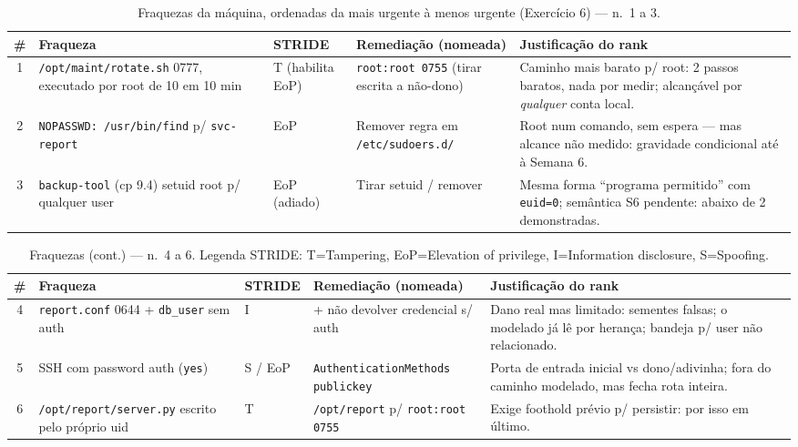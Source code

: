 \documentclass[a4paper,11pt]{article}
\newcommand{\cmd}[1]{\textcolor{sscnblue}{\texttt{#1}}}
\begin{document}
\begin{table}[H]
\centering
\caption{Fraquezas da m\'aquina, ordenadas da mais urgente \`a menos urgente (Exerc\'icio 6) --- n.\textordmasculine\ 1 a 3.}
\label{tab:prioridades}
\scriptsize
\setlength{\tabcolsep}{3pt}
\renewcommand{\arraystretch}{1.25}
\begin{tabularx}{\textwidth}{@{}c >{\raggedright\arraybackslash}p{3.2cm} >{\raggedright\arraybackslash}p{1.7cm} >{\raggedright\arraybackslash}p{3.1cm} >{\raggedright\arraybackslash}X@{}}
\toprule
\textbf{\#} & \textbf{Fraqueza} & \textbf{STRIDE} & \textbf{Remedia\c{c}\~ao (nomeada)} & \textbf{Justifica\c{c}\~ao do rank} \\
\midrule
\rowcolor{sscbg}
1 & \cmd{/opt/maint/rotate.sh} 0777, executado por root de 10 em 10 min & T (habilita EoP) & \cmd{root:root 0755} (tirar escrita a n\~ao-dono) & Caminho mais barato p/ root: 2 passos baratos, nada por medir; alcan\c{c}\'avel por \emph{qualquer} conta local. \\
2 & \cmd{NOPASSWD: /usr/bin/find} p/ \cmd{svc-report} & EoP & Remover regra em \cmd{/etc/sudoers.d/} & Root num comando, sem espera --- mas alcance n\~ao medido: gravidade condicional at\'e \`a Semana 6. \\
\rowcolor{sscbg}
3 & \cmd{backup-tool} (cp 9.4) setuid root p/ qualquer user & EoP (adiado) & Tirar setuid / remover & Mesma forma ``programa permitido'' com \cmd{euid=0}; sem\^antica S6 pendente: abaixo de 2 demonstradas. \\
\bottomrule
\end{tabularx}
\end{table}

\begin{table}[H]
\centering
\caption{Fraquezas (cont.) --- n.\textordmasculine\ 4 a 6. Legenda STRIDE: T=Tampering, EoP=Elevation of privilege, I=Information disclosure, S=Spoofing.}
\scriptsize
\setlength{\tabcolsep}{3pt}
\renewcommand{\arraystretch}{1.25}
\begin{tabularx}{\textwidth}{@{}c >{\raggedright\arraybackslash}p{3.2cm} >{\raggedright\arraybackslash}p{1.7cm} >{\raggedright\arraybackslash}p{3.1cm} >{\raggedright\arraybackslash}X@{}}
\toprule
\textbf{\#} & \textbf{Fraqueza} & \textbf{STRIDE} & \textbf{Remedia\c{c}\~ao (nomeada)} & \textbf{Justifica\c{c}\~ao do rank} \\
\midrule
4 & \cmd{report.conf} 0644 + \cmd{db\_user} sem auth & I & 0600 + n\~ao devolver credencial s/ auth & Dano real mas limitado: sementes falsas; o modelado j\'a l\^e por heran\c{c}a; bandeja p/ user n\~ao relacionado. \\
\rowcolor{sscbg}
5 & SSH com password auth (\cmd{yes}) & S / EoP & \cmd{AuthenticationMethods publickey} & Porta de entrada inicial vs dono/adivinha; fora do caminho modelado, mas fecha rota inteira. \\
6 & \cmd{/opt/report/server.py} escrito pelo pr\'oprio uid & T & \cmd{/opt/report} p/ \cmd{root:root 0755} & Exige foothold pr\'evio p/ persistir: por isso em \'{u}ltimo. \\
\bottomrule
\end{tabularx}
\end{table}
\end{document}

